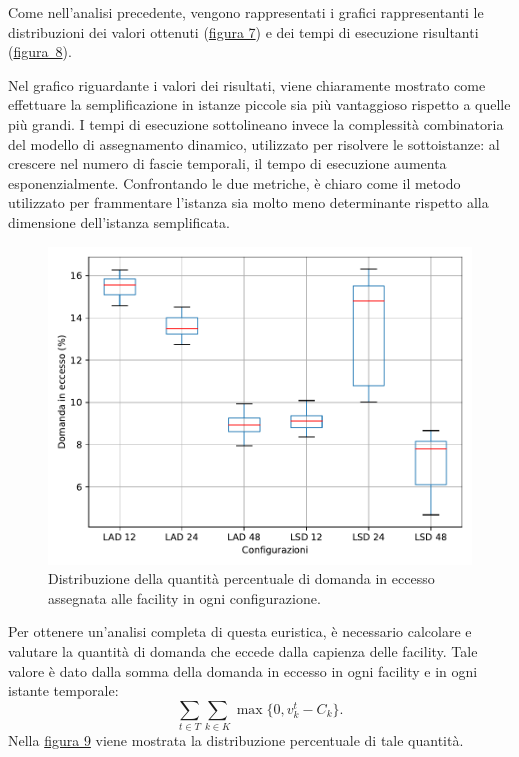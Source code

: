 Come nell'analisi precedente, vengono rappresentati i grafici rappresentanti le distribuzioni dei valori ottenuti (\hyperref[graf:e2-valore-range]{figura 7}) e dei tempi di esecuzione risultanti (\hyperref[graf:e2-tempo-range]{figura~8}).

Nel grafico riguardante i valori dei risultati, viene chiaramente mostrato come effettuare la semplificazione in istanze piccole sia più vantaggioso rispetto a quelle più grandi. I tempi di esecuzione sottolineano invece la complessità combinatoria del modello di assegnamento dinamico, utilizzato per risolvere le sottoistanze: al crescere nel numero di fascie temporali, il tempo di esecuzione aumenta esponenzialmente. Confrontando le due metriche, è chiaro come il metodo utilizzato per frammentare l'istanza sia molto meno determinante rispetto alla dimensione dell'istanza semplificata.
\begin{figure}[H]
    \centering
    \includegraphics[scale=0.70]{img/grafico-e2-eccesso.pdf}
    \caption{Distribuzione della quantità percentuale di domanda in eccesso assegnata alle facility in ogni configurazione.}
    \label{graf:e2-eccesso-range}
\end{figure}
Per ottenere un'analisi completa di questa euristica, è necessario calcolare e valutare la quantità di domanda che eccede dalla capienza delle facility. Tale valore è dato dalla somma della domanda in eccesso in ogni facility e in ogni istante temporale:
\begin{equation}
    \sum_{t \in T} \sum_{k \in K} \max\{0, v^t_k - C_k\}.
\end{equation}
Nella \hyperref[graf:e2-eccesso-range]{figura 9} viene mostrata la distribuzione percentuale di tale quantità.
